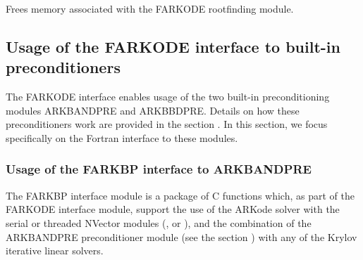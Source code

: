 \documentclass[letterpaper,10pt,english]{sphinxmanual}
\begin{document}
\begin{fulllineitems}
\label{f_interface/Rootfinding:f/_/FARKROOTFREE}
Frees memory associated with the FARKODE rootfinding module.

\end{fulllineitems}



\subsection{Usage of the FARKODE interface to built-in preconditioners}
\label{f_interface/Preconditioning:finterface-preconditioning}\label{f_interface/Preconditioning::doc}\label{f_interface/Preconditioning:usage-of-the-farkode-interface-to-built-in-preconditioners}
The FARKODE interface enables usage of the two built-in
preconditioning modules ARKBANDPRE and ARKBBDPRE.  Details on how
these preconditioners work are provided in the section
{\hyperref[c_interface/Preconditioners:cinterface-preconditionermodules]{\emph{}}}.  In this section, we focus
specifically on the Fortran interface to these modules.


\subsubsection{Usage of the FARKBP interface to ARKBANDPRE}
\label{f_interface/Preconditioning:usage-of-the-farkbp-interface-to-arkbandpre}\label{f_interface/Preconditioning:finterface-bandpre}
The FARKBP interface module is a package of C functions which,
as part of the FARKODE interface module, support the use of the
ARKode solver with the serial or threaded NVector modules
({\hyperref[nvectors/NVector_Serial:nvectors-nvserial]{\emph{}}}, {\hyperref[nvectors/NVector_OpenMP:nvectors-openmp]{\emph{}}} or
{\hyperref[nvectors/NVector_Pthreads:nvectors-pthreads]{\emph{}}}), and the combination of the ARKBANDPRE
preconditioner module (see the section {\hyperref[c_interface/Preconditioners:cinterface-bandpre]{\emph{}}}) with
any of the Krylov iterative linear solvers.
\end{document}
